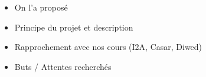 \begin{itemize}
	\item{On l'a proposé}
	\item{Principe du projet et description}
	\item{Rapprochement avec nos cours (I2A, Casar, Diwed)}
	\item{Buts / Attentes recherchés}
\end{itemize}
		
